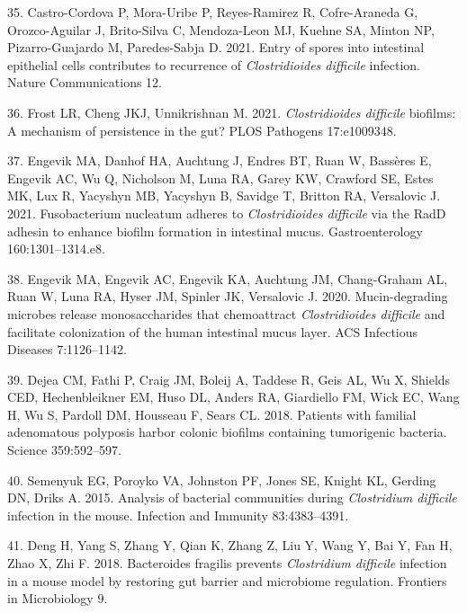 \documentclass[
  11pt,
]{article}
\begin{document}
\leavevmode\hypertarget{ref-CastroCrdova2021}{}%
35. Castro-Cordova P, Mora-Uribe P, Reyes-Ramirez R, Cofre-Araneda G,
Orozco-Aguilar J, Brito-Silva C, Mendoza-Leon MJ, Kuehne SA, Minton NP,
Pizarro-Guajardo M, Paredes-Sabja D. 2021. Entry of spores into
intestinal epithelial cells contributes to recurrence of
\emph{Clostridioides difficile} infection. Nature Communications 12.

\leavevmode\hypertarget{ref-Frost2021}{}%
36. Frost LR, Cheng JKJ, Unnikrishnan M. 2021. \emph{Clostridioides
difficile} biofilms: A mechanism of persistence in the gut? PLOS
Pathogens 17:e1009348.

\leavevmode\hypertarget{ref-Engevik2021}{}%
37. Engevik MA, Danhof HA, Auchtung J, Endres BT, Ruan W, Bassères E,
Engevik AC, Wu Q, Nicholson M, Luna RA, Garey KW, Crawford SE, Estes MK,
Lux R, Yacyshyn MB, Yacyshyn B, Savidge T, Britton RA, Versalovic J.
2021. Fusobacterium nucleatum adheres to \emph{Clostridioides difficile}
via the RadD adhesin to enhance biofilm formation in intestinal mucus.
Gastroenterology 160:1301--1314.e8.

\leavevmode\hypertarget{ref-Engevik2020}{}%
38. Engevik MA, Engevik AC, Engevik KA, Auchtung JM, Chang-Graham AL,
Ruan W, Luna RA, Hyser JM, Spinler JK, Versalovic J. 2020.
Mucin-degrading microbes release monosaccharides that chemoattract
\emph{Clostridioides difficile} and facilitate colonization of the human
intestinal mucus layer. ACS Infectious Diseases 7:1126--1142.

\leavevmode\hypertarget{ref-Dejea2018}{}%
39. Dejea CM, Fathi P, Craig JM, Boleij A, Taddese R, Geis AL, Wu X,
Shields CED, Hechenbleikner EM, Huso DL, Anders RA, Giardiello FM, Wick
EC, Wang H, Wu S, Pardoll DM, Housseau F, Sears CL. 2018. Patients with
familial adenomatous polyposis harbor colonic biofilms containing
tumorigenic bacteria. Science 359:592--597.

\leavevmode\hypertarget{ref-Semenyuk2015}{}%
40. Semenyuk EG, Poroyko VA, Johnston PF, Jones SE, Knight KL, Gerding
DN, Driks A. 2015. Analysis of bacterial communities during
\emph{Clostridium difficile} infection in the mouse. Infection and
Immunity 83:4383--4391.

\leavevmode\hypertarget{ref-Deng2018}{}%
41. Deng H, Yang S, Zhang Y, Qian K, Zhang Z, Liu Y, Wang Y, Bai Y, Fan
H, Zhao X, Zhi F. 2018. Bacteroides fragilis prevents \emph{Clostridium
difficile} infection in a mouse model by restoring gut barrier and
microbiome regulation. Frontiers in Microbiology 9.
\end{document}
